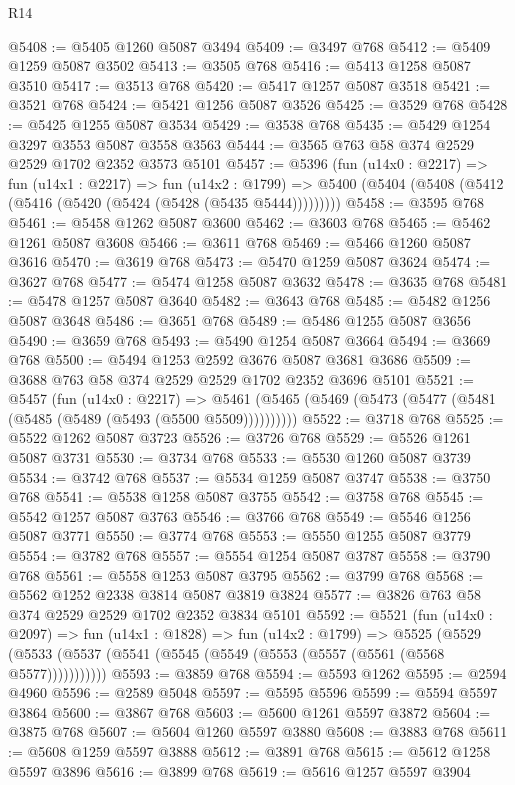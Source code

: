 \begin{lexlean}{R14}
\begin{coremodule}
@5408 := @5405 @1260 @5087 @3494
@5409 := @3497 @768
@5412 := @5409 @1259 @5087 @3502
@5413 := @3505 @768
@5416 := @5413 @1258 @5087 @3510
@5417 := @3513 @768
@5420 := @5417 @1257 @5087 @3518
@5421 := @3521 @768
@5424 := @5421 @1256 @5087 @3526
@5425 := @3529 @768
@5428 := @5425 @1255 @5087 @3534
@5429 := @3538 @768
@5435 := @5429 @1254 @3297 @3553 @5087 @3558 @3563
@5444 := @3565 @763 @58 @374 @2529 @2529 @1702 @2352 @3573 @5101
@5457 := @5396
    (fun (u14x0 : @2217) =>
    fun (u14x1 : @2217) =>
    fun (u14x2 : @1799) =>
    @5400 (@5404 (@5408 (@5412 (@5416 (@5420 (@5424 (@5428 (@5435 @5444)))))))))
@5458 := @3595 @768
@5461 := @5458 @1262 @5087 @3600
@5462 := @3603 @768
@5465 := @5462 @1261 @5087 @3608
@5466 := @3611 @768
@5469 := @5466 @1260 @5087 @3616
@5470 := @3619 @768
@5473 := @5470 @1259 @5087 @3624
@5474 := @3627 @768
@5477 := @5474 @1258 @5087 @3632
@5478 := @3635 @768
@5481 := @5478 @1257 @5087 @3640
@5482 := @3643 @768
@5485 := @5482 @1256 @5087 @3648
@5486 := @3651 @768
@5489 := @5486 @1255 @5087 @3656
@5490 := @3659 @768
@5493 := @5490 @1254 @5087 @3664
@5494 := @3669 @768
@5500 := @5494 @1253 @2592 @3676 @5087 @3681 @3686
@5509 := @3688 @763 @58 @374 @2529 @2529 @1702 @2352 @3696 @5101
@5521 := @5457
    (fun (u14x0 : @2217) =>
    @5461 (@5465 (@5469 (@5473 (@5477 (@5481 (@5485 (@5489 (@5493 (@5500 @5509))))))))))
@5522 := @3718 @768
@5525 := @5522 @1262 @5087 @3723
@5526 := @3726 @768
@5529 := @5526 @1261 @5087 @3731
@5530 := @3734 @768
@5533 := @5530 @1260 @5087 @3739
@5534 := @3742 @768
@5537 := @5534 @1259 @5087 @3747
@5538 := @3750 @768
@5541 := @5538 @1258 @5087 @3755
@5542 := @3758 @768
@5545 := @5542 @1257 @5087 @3763
@5546 := @3766 @768
@5549 := @5546 @1256 @5087 @3771
@5550 := @3774 @768
@5553 := @5550 @1255 @5087 @3779
@5554 := @3782 @768
@5557 := @5554 @1254 @5087 @3787
@5558 := @3790 @768
@5561 := @5558 @1253 @5087 @3795
@5562 := @3799 @768
@5568 := @5562 @1252 @2338 @3814 @5087 @3819 @3824
@5577 := @3826 @763 @58 @374 @2529 @2529 @1702 @2352 @3834 @5101
@5592 := @5521
    (fun (u14x0 : @2097) =>
    fun (u14x1 : @1828) =>
    fun (u14x2 : @1799) =>
    @5525 (@5529 (@5533 (@5537 (@5541 (@5545 (@5549 (@5553 (@5557 (@5561 (@5568 @5577)))))))))))
@5593 := @3859 @768
@5594 := @5593 @1262
@5595 := @2594 @4960
@5596 := @2589 @5048
@5597 := @5595 @5596
@5599 := @5594 @5597 @3864
@5600 := @3867 @768
@5603 := @5600 @1261 @5597 @3872
@5604 := @3875 @768
@5607 := @5604 @1260 @5597 @3880
@5608 := @3883 @768
@5611 := @5608 @1259 @5597 @3888
@5612 := @3891 @768
@5615 := @5612 @1258 @5597 @3896
@5616 := @3899 @768
@5619 := @5616 @1257 @5597 @3904

\end{coremodule}
\end{lexlean}
